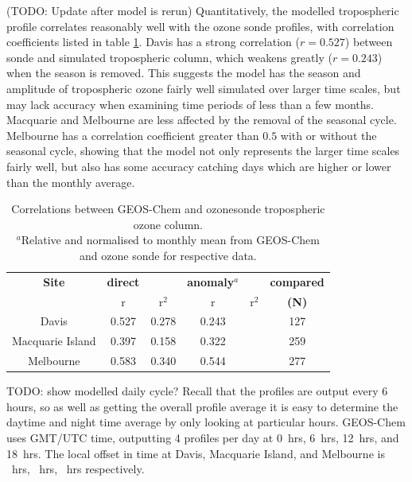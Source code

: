     (TODO: Update after model is rerun)
    Quantitatively, the modelled tropospheric profile correlates reasonably well with the ozone sonde profiles, with correlation coefficients listed in table \ref{ch_o3:tab:station_correlations}.
    Davis has a strong correlation ($r=0.527$) between sonde and simulated tropospheric column, which weakens greatly ($r=0.243$) when the season is removed.
    This suggests the model has the season and amplitude of tropospheric ozone fairly well simulated over larger time scales, but may lack accuracy when examining time periods of less than a few months.
    Macquarie and Melbourne are less affected by the removal of the seasonal cycle.
    Melbourne has a correlation coefficient greater than $0.5$ with or without the seasonal cycle, showing that the model not only represents the larger time scales fairly well, but also has some accuracy catching days which are higher or lower than the monthly average.
    
    \begin{table}
    \begin{tabular}{ | c  c  c  c  c  c | }
      \hline
      \textbf{Site} & \textbf{direct} & & \textbf{anomaly$^a$} & & \textbf{compared}
      \\            & r  & r$^2$      & r & r$^2$   & \textbf{(N)}
      \\ \hline
      Davis & 0.527 & 0.278 & 0.243 & & 127
      \\
      Macquarie Island &  0.397 & 0.158 & 0.322 & & 259
      \\ %
      Melbourne & 0.583 & 0.340 & 0.544 & & 277
      \\ \hline
    \end{tabular}
    \caption{Correlations between GEOS-Chem and ozonesonde tropospheric ozone column.
    \hspace{\textwidth} \\ 
    ${}^a$Relative and normalised to monthly mean from GEOS-Chem and ozone sonde for respective data. \hspace{\textwidth} \\ }
    \label{ch_o3:tab:station_correlations}
    \end{table}
        
    TODO: show modelled daily cycle?
    Recall that the profiles are output every 6 hours, so as well as getting the overall profile average it is easy to determine the daytime and night time average by only looking at particular hours.
    GEOS-Chem uses GMT/UTC time, outputting 4 profiles per day at 0~hrs, 6~hrs, 12~hrs, and 18~hrs.
    The local offset in time at Davis, Macquarie Island, and Melbourne is ~hrs, ~hrs, ~hrs respectively.
    

